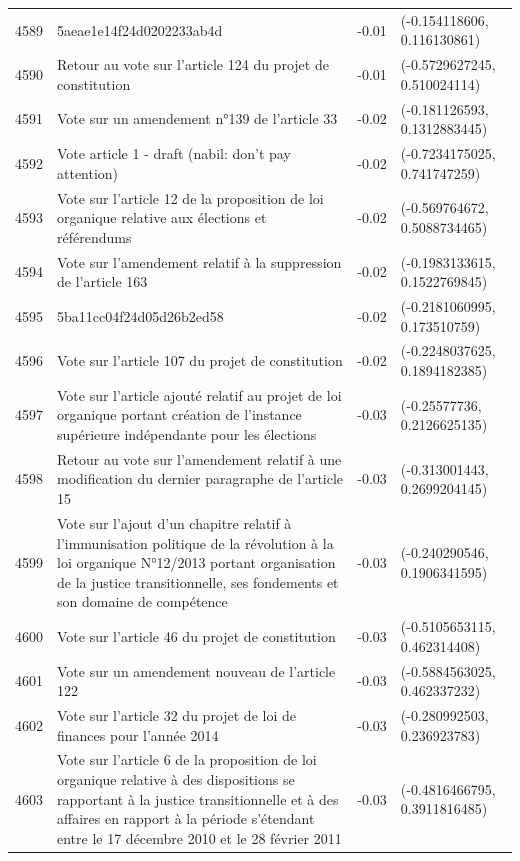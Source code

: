\begin{table}[ht]
\begin{tabular}{rlrl}
  4589 & 5aeae1e14f24d0202233ab4d & -0.01 & (-0.154118606, 0.116130861) \\ 
  4590 & Retour au vote sur l'article 124 du projet de constitution & -0.01 & (-0.5729627245, 0.510024114) \\ 
  4591 & Vote sur un amendement n°139 de l'article 33 & -0.02 & (-0.181126593, 0.1312883445) \\ 
  4592 & Vote article 1 - draft (nabil: don't pay attention) & -0.02 & (-0.7234175025, 0.741747259) \\ 
  4593 & Vote sur l'article 12 de la proposition de loi organique relative aux élections et référendums & -0.02 & (-0.569764672, 0.5088734465) \\ 
  4594 & Vote sur l'amendement relatif à la suppression de l'article 163 & -0.02 & (-0.1983133615, 0.1522769845) \\ 
  4595 & 5ba11cc04f24d05d26b2ed58 & -0.02 & (-0.2181060995, 0.173510759) \\ 
  4596 & Vote sur l'article 107 du projet de constitution & -0.02 & (-0.2248037625, 0.1894182385) \\ 
  4597 & Vote sur l'article ajouté relatif au projet de loi organique portant création de l'instance supérieure indépendante pour les élections & -0.03 & (-0.25577736, 0.2126625135) \\ 
  4598 & Retour au vote sur l'amendement relatif à une modification du dernier paragraphe de l'article 15 & -0.03 & (-0.313001443, 0.2699204145) \\ 
  4599 & Vote sur l'ajout d'un chapitre relatif à l'immunisation politique de la révolution à la loi organique N°12/2013 portant organisation de la justice transitionnelle, ses fondements et son domaine de compétence & -0.03 & (-0.240290546, 0.1906341595) \\ 
  4600 & Vote sur l'article 46 du projet de constitution & -0.03 & (-0.5105653115, 0.462314408) \\ 
  4601 & Vote sur un amendement nouveau de l'article 122 & -0.03 & (-0.5884563025, 0.462337232) \\ 
  4602 & Vote sur l'article 32 du projet de loi de finances pour l'année 2014 & -0.03 & (-0.280992503, 0.236923783) \\ 
  4603 & Vote sur l'article 6 de la proposition de loi organique relative à des dispositions se rapportant à la justice transitionnelle et à des affaires en rapport à la période s'étendant entre le 17 décembre 2010 et le 28 février 2011 & -0.03 & (-0.4816466795, 0.3911816485) \\ 

\end{tabular}
\end{table}
